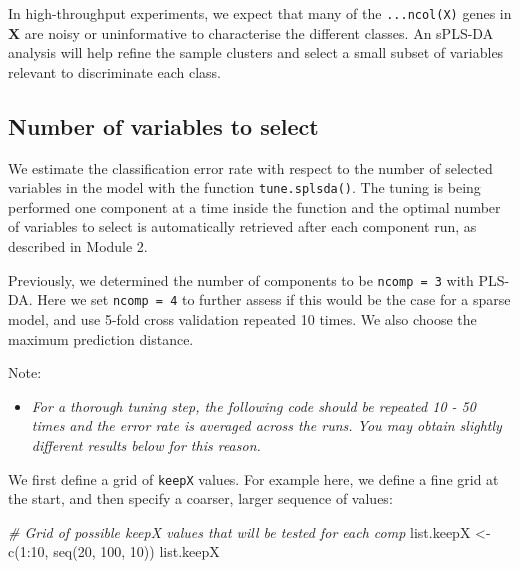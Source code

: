 \documentclass[
]{book}
\newenvironment{Shaded}{\begin{snugshade}}{\end{snugshade}}
\newcommand{\CommentTok}[1]{\textcolor[rgb]{0.56,0.35,0.01}{\textit{#1}}}
\newcommand{\DecValTok}[1]{\textcolor[rgb]{0.00,0.00,0.81}{#1}}
\newcommand{\FunctionTok}[1]{\textcolor[rgb]{0.00,0.00,0.00}{#1}}
\newcommand{\NormalTok}[1]{#1}
\newcommand{\OtherTok}[1]{\textcolor[rgb]{0.56,0.35,0.01}{#1}}
\newcommand{\SpecialCharTok}[1]{\textcolor[rgb]{0.00,0.00,0.00}{#1}}
\providecommand{\tightlist}{%
  \setlength{\itemsep}{0pt}\setlength{\parskip}{0pt}}
\begin{document}
In high-throughput experiments, we expect that many of the \texttt{...ncol(X)} genes in \(\boldsymbol X\) are noisy or uninformative to characterise the different classes. An sPLS-DA analysis will help refine the sample clusters and select a small subset of variables relevant to discriminate each class.

\hypertarget{plsda:result:numvar}{%
\subsection{Number of variables to select}\label{plsda:result:numvar}}

We estimate the classification error rate with respect to the number of selected variables in the model with the function \texttt{tune.splsda()}. The tuning is being performed one component at a time inside the function and the optimal number of variables to select is automatically retrieved after each component run, as described in Module 2.

Previously, we determined the number of components to be \texttt{ncomp\ =\ 3} with PLS-DA. Here we set \texttt{ncomp\ =\ 4} to further assess if this would be the case for a sparse model, and use 5-fold cross validation repeated 10 times. We also choose the maximum prediction distance.

Note:

\begin{itemize}
\tightlist
\item
  \emph{For a thorough tuning step, the following code should be repeated 10 - 50 times and the error rate is averaged across the runs. You may obtain slightly different results below for this reason.}
\end{itemize}

We first define a grid of \texttt{keepX} values. For example here, we define a fine grid at the start, and then specify a coarser, larger sequence of values:

\begin{Shaded}
\begin{Highlighting}[]
\CommentTok{\# Grid of possible keepX values that will be tested for each comp}
\NormalTok{list.keepX }\OtherTok{\textless{}{-}} \FunctionTok{c}\NormalTok{(}\DecValTok{1}\SpecialCharTok{:}\DecValTok{10}\NormalTok{,  }\FunctionTok{seq}\NormalTok{(}\DecValTok{20}\NormalTok{, }\DecValTok{100}\NormalTok{, }\DecValTok{10}\NormalTok{))}
\NormalTok{list.keepX}
\end{Highlighting}
\end{Shaded}
\end{document}
